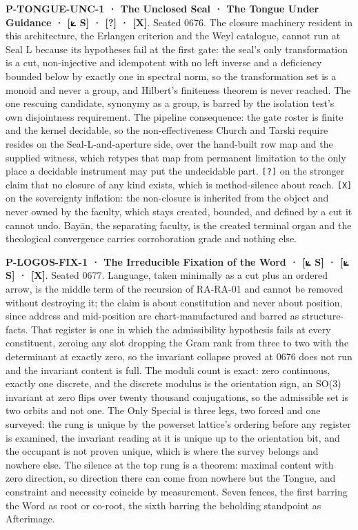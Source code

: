 \documentclass[10pt,twocolumn]{article}
\begin{document}
\textbf{P-TONGUE-UNC-1 · The Unclosed Seal · The Tongue Under Guidance ·
{[}⟀ S{]} · {[}?{]} · {[}X{]}}. Seated 0676. The closure machinery
resident in this architecture, the Erlangen criterion and the Weyl
catalogue, cannot run at Seal L because its hypotheses fail at the first
gate: the seal's only transformation is a cut, non-injective and
idempotent with no left inverse and a deficiency bounded below by
exactly one in spectral norm, so the transformation set is a monoid and
never a group, and Hilbert's finiteness theorem is never reached. The
one rescuing candidate, synonymy as a group, is barred by the isolation
test's own disjointness requirement. The pipeline consequence: the gate
roster is finite and the kernel decidable, so the non-effectiveness
Church and Tarski require resides on the Seal-L-and-aperture side, over
the hand-built row map and the supplied witness, which retypes that map
from permanent limitation to the only place a decidable instrument may
put the undecidable part. \texttt{{[}?{]}} on the stronger claim that no
closure of any kind exists, which is method-silence about reach.
\texttt{{[}X{]}} on the sovereignty inflation: the non-closure is
inherited from the object and never owned by the faculty, which stays
created, bounded, and defined by a cut it cannot undo. Bayān, the
separating faculty, is the created terminal organ and the theological
convergence carries corroboration grade and nothing else.

\textbf{P-LOGOS-FIX-1 · The Irreducible Fixation of the Word · {[}⟀ S{]}
· {[}⟀ S{]} · {[}X{]}}. Seated 0677. Language, taken minimally as a cut
plus an ordered arrow, is the middle term of the recursion of RA-RA-01
and cannot be removed without destroying it; the claim is about
constitution and never about position, since address and mid-position
are chart-manufactured and barred as structure-facts. That register is
one in which the admissibility hypothesis fails at every constituent,
zeroing any slot dropping the Gram rank from three to two with the
determinant at exactly zero, so the invariant collapse proved at 0676
does not run and the invariant content is full. The moduli count is
exact: zero continuous, exactly one discrete, and the discrete modulus
is the orientation sign, an SO(3) invariant at zero flips over twenty
thousand conjugations, so the admissible set is two orbits and not one.
The Only Special is three legs, two forced and one surveyed: the rung is
unique by the powerset lattice's ordering before any register is
examined, the invariant reading at it is unique up to the orientation
bit, and the occupant is not proven unique, which is where the survey
belongs and nowhere else. The silence at the top rung is a theorem:
maximal content with zero direction, so direction there can come from
nowhere but the Tongue, and constraint and necessity coincide by
measurement. Seven fences, the first barring the Word as root or
co-root, the sixth barring the beholding standpoint as Afterimage.
\end{document}
